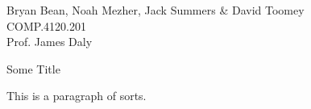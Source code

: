 \documentclass[10pt,draft]{article}
\begin{document}
\begin{flushright}
Bryan Bean, Noah Mezher, Jack Summers \& David Toomey\\
COMP.4120.201\\
Prof. James Daly
\end{flushright}
\begin{center}
Some Title
\end{center}
\begin{flushleft}
This is a paragraph of sorts.
\end{flushleft}
\end{document}
